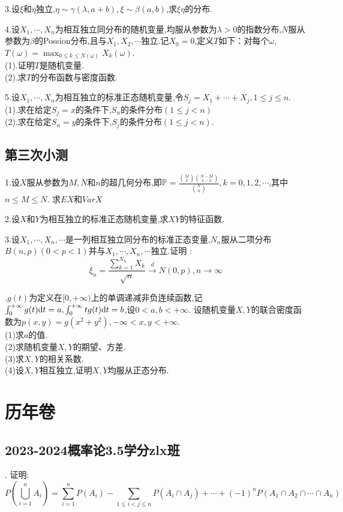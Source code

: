 \noindent 3.设$\xi$和$\eta$独立,$\eta\sim\gamma(\lambda,a+b),\xi\sim\beta(a,b)$,求$\xi\eta$的分布.

\noindent 4.设$X_1,\cdots,X_n$为相互独立同分布的随机变量,均服从参数为$\lambda>0$的指数分布,$N$服从参数为$\beta$的Possion分布,且与$X_1,X_2,\cdots$独立.记$X_0=0$,定义$T$如下：对每个$\omega$,$T(\omega)=\max_{0\leq k \leq N(\omega)}X_k(\omega)$.\\
(1).证明$T$是随机变量.\\
(2).求$T$的分布函数与密度函数.

\noindent 5.设$X_1,\cdots,X_n$为相互独立的标准正态随机变量,令$S_j=X_1+\cdots+X_j,1\leq j\leq n$.\\
(1).求在给定$S_j=x$的条件下,$S_n$的条件分布$(1\leq j <n)$\\
(2).求在给定$S_n=y$的条件下,$S_j$的条件分布$(1\leq j <n)$.
\newpage
\section{第三次小测}
\noindent 1.设$X$服从参数为$M,N$和$n$的超几何分布,即$\mathbb{P}=\frac{\binom{M}{k}\binom{N-M}{n-k}}{\binom{N}{n}},k=0,1,2,\cdots$,其中$n\leq M\leq N$.
求$EX$和$Var X$

\noindent 2.设$X$和$Y$为相互独立的标准正态随机变量,求$XY$的特征函数.

\noindent 3.设$X_1,\cdots,X_n,\cdots$是一列相互独立同分布的标准正态变量,$N_n$服从二项分布$B(n,p)(0<p<1)$并与$X_1,\cdots,X_n,\cdots$独立.证明 :
$$\xi_n=\frac{\sum_{k=1}^{N_n}X_k}{\sqrt{n}} \xrightarrow{d} N(0,p),n\to \infty$$

.$g(t)$为定义在$[0,+\infty)$上的单调递减非负连续函数,记$\int_{0}^{+\infty}g(t){\rm d}t=a,\int_{0}^{+\infty}tg(t){\rm d}t=b$,设$0<a,b<+\infty$.
设随机变量$X,Y$的联合密度函数为$p(x,y)=g(x^2+y^2),-\infty<x,y<+\infty$.\\
(1)求$a$的值.\\
(2)求随机变量$X,Y$的期望、方差.\\
(3)求$X,Y$的相关系数.\\
(4)设$X,Y$相互独立,证明$X,Y$均服从正态分布.

\chapter{历年卷}
\section{2023-2024概率论3.5学分zlx班}
. 证明:
$$P\left(\bigcup_{i=1}^nA_i\right)=\sum_{i=1}^nP(A_i)-\sum_{1\leq i<j\leq n}P(A_i\cap A_j)+\cdots+(-1)^nP(A_1\cap A_2\cap \cdots \cap A_n)$$


